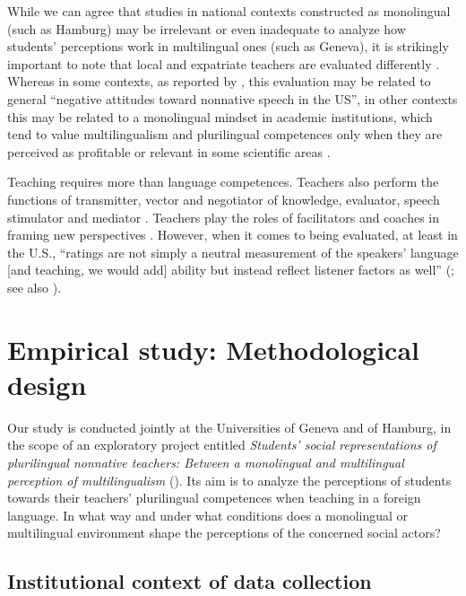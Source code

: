 \documentclass[output=paper]{../langscibook}
\begin{document}
While we can agree that studies in national contexts constructed as monolingual (such as Hamburg) may be irrelevant or even inadequate to analyze how students’ perceptions work in multilingual ones (such as Geneva), it is strikingly important to note that local and expatriate teachers are evaluated differently \citep{Subtirelu2015}. Whereas in some contexts, as reported by \citet[650]{LindemannMoran2017}, this evaluation may be related to general “negative attitudes toward nonnative speech in the US”, in other contexts this may be related to a monolingual mindset in academic institutions, which tend to value multilingualism and plurilingual competences only when they are perceived as profitable or relevant in some scientific areas \citep{BerthoudEtAl2013,Gajo2013,Melo-Pfeifer2017,YanaprasartLüdi2018}.

\hspace*{-1mm}Teaching requires more than language competences. Teachers also perform the functions of transmitter, vector and negotiator of knowledge, evaluator, speech stimulator and mediator \citep{Gajo2005}. Teachers play the roles of facilitators and coaches in framing new perspectives \citep{RoussiCherkaoui2011}. However, when it comes to being evaluated, at least in the U.S., “ratings are not simply a neutral measurement of the speakers’ language [and teaching, we would add] ability but instead reflect listener factors as well” (\citealt[700]{KangEtAl2015}; see also \citealt{LindemannSubtirelu2013}).

\section{Empirical study: Methodological design}

Our study is conducted jointly at the Universities of Geneva and of Hamburg, in the scope of an exploratory project entitled \emph{Students’ social representations of plurilingual nonnative teachers: Between a monolingual and multilingual perception of multilingualism} (\citealt{YanaprasartMelo-Pfeifer2017,YanaprasartMelo-Pfeifer2019}). Its aim is to analyze the perceptions of students towards their teachers’ plurilingual competences when teaching in a foreign language. In what way and under what conditions does a monolingual or multilingual environment shape the perceptions of the concerned social actors?

\subsection{Institutional context of data collection}
\end{document}
